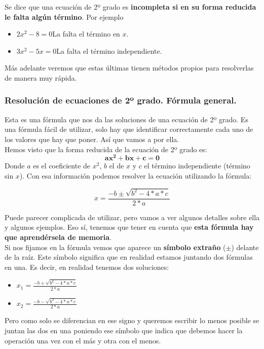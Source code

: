 \documentclass[a4paper,11pt,answers]{exam}
\begin{document}
  Se dice que una ecuación de 2º grado es \textbf{incompleta si en su forma reducida le falta algún término}. Por ejemplo\\
  \begin{itemize}
  \item $2x^2 - 8 = 0$\quad\quad La falta el término en $x$.
  \item $3x^2 - 5x = 0$\quad\quad La falta el término independiente.
  \end{itemize}

  Más adelante veremos que estas últimas tienen métodos propios para resolverlas de manera muy rápida.
  \subsubsection{Resolución de ecuaciones de 2º grado. Fórmula general.}
  Esta es una fórmula que nos da las soluciones de una ecuación de 2º grado. Es una fórmula fácil de utilizar, solo hay que identificar correctamente cada uno de los valores que hay que poner. Así que vamos a por ella.\\

  Hemos visto que la forma reducida de la ecuación de 2º grado es:
  \[\boldsymbol{ax^2 + bx + c = 0}\]
  Donde $a$ es el coeficiente de $x^2$, $b$ el de $x$ y $c$ el término independiente (término sin $x$). Con esa información podemos resolver la ecuación utilizando la fórmula:
  \begin{large}
    \[x = \frac{-b\pm \sqrt{b^2 - 4*a*c}}{2*a}\]
  \end{large}
  Puede parecer complicada de utilizar, pero vamos a ver algunos detalles sobre ella y algunos ejemplos. Eso sí, tenemos que tener en cuenta que \textbf{esta fórmula hay que aprendérsela de memoria}.\\

  Si nos fijamos en la fórmula vemos que aparece un \textbf{símbolo extraño} ($\boldsymbol{\pm}$) delante de la raíz. Este símbolo significa que en realidad estamos juntando dos fórmulas en una. Es decir, en realidad tenemos dos soluciones:
  \begin{itemize}
  \item $x_1 = \frac{-b+ \sqrt{b^2 - 4*a*c}}{2*a}$
  \item $x_ 2 = \frac{-b- \sqrt{b^2 - 4*a*c}}{2*a}$
  \end{itemize}
  Pero como solo se diferencian en ese signo y queremos escribir lo menos posible se juntan las dos en una poniendo ese símbolo que indica que debemos hacer la operación una vez con el más y otra con el menos.\\
\end{document}
